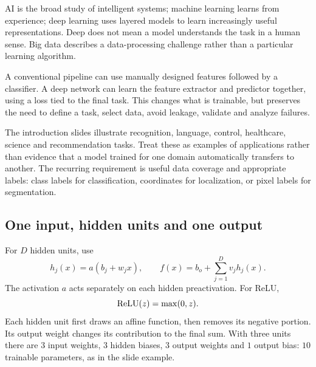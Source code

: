 \documentclass[11pt]{article}
\begin{document}
\tableofcontents\clearpage
{}
AI is the broad study of intelligent systems; machine learning learns from experience; deep learning uses layered models to learn increasingly useful representations. Deep does not mean a model understands the task in a human sense. Big data describes a data-processing challenge rather than a particular learning algorithm.

A conventional pipeline can use manually designed features followed by a classifier. A deep network can learn the feature extractor and predictor together, using a loss tied to the final task. This changes what is trainable, but preserves the need to define a task, select data, avoid leakage, validate and analyze failures.

The introduction slides illustrate recognition, language, control, healthcare, science and recommendation tasks. Treat these as examples of applications rather than evidence that a model trained for one domain automatically transfers to another. The recurring requirement is useful data coverage and appropriate labels: class labels for classification, coordinates for localization, or pixel labels for segmentation.
\subsection{One input, hidden units and one output}
For $D$ hidden units, use
\[
h_j(x)=a(b_j+w_jx),\qquad f(x)=b_o+\sum_{j=1}^Dv_jh_j(x).
\]
The activation $a$ acts separately on each hidden preactivation. For ReLU,
\[
\operatorname{ReLU}(z)=\max(0,z).
\]
Each hidden unit first draws an affine function, then removes its negative portion. Its output weight changes its contribution to the final sum. With three units there are $3$ input weights, $3$ hidden biases, $3$ output weights and $1$ output bias: $10$ trainable parameters, as in the slide example.
\end{document}
